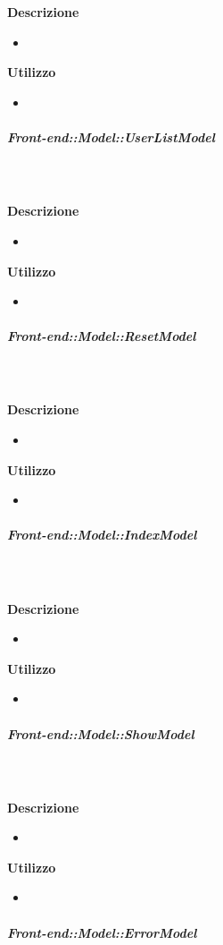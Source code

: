 \begin{itemize}
        \textbf{\\ \\ Descrizione} 
          \begin{itemize}
            \item[] 
          \end{itemize}      
        \textbf{Utilizzo}  
          \begin{itemize}
            \item[] 
          \end{itemize}
      \subparagraph{Front-end::Model::UserListModel}
        
        \textbf{\\ \\ Descrizione} 
          \begin{itemize}
            \item[] 
          \end{itemize}      
        \textbf{Utilizzo}  
          \begin{itemize}
            \item[] 
          \end{itemize}
      \subparagraph{Front-end::Model::ResetModel}
        
        \textbf{\\ \\ Descrizione} 
          \begin{itemize}
            \item[] 
          \end{itemize}      
        \textbf{Utilizzo}  
          \begin{itemize}
            \item[] 
          \end{itemize}
      \subparagraph{Front-end::Model::IndexModel}
        
        \textbf{\\ \\ Descrizione} 
          \begin{itemize}
            \item[] 
          \end{itemize}      
        \textbf{Utilizzo}  
          \begin{itemize}
            \item[] 
          \end{itemize}
      \subparagraph{Front-end::Model::ShowModel}
        
        \textbf{\\ \\ Descrizione} 
          \begin{itemize}
            \item[] 
          \end{itemize}      
        \textbf{Utilizzo}  
          \begin{itemize}
            \item[] 
          \end{itemize}
      \subparagraph{Front-end::Model::ErrorModel}
        

\end{itemize}
